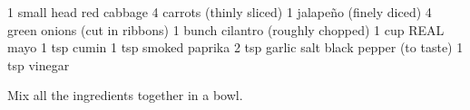\dishtype{\side}
\dishother{\vegetarian}
\begin{ingreds}
    1 small head red cabbage
    4 carrots (thinly sliced)
    1 jalapeño (finely diced)
    4 green onions (cut in ribbons)
    1 bunch cilantro (roughly chopped)
    1 cup REAL mayo
    1 tsp cumin
    1 tsp smoked paprika
    2 tsp garlic salt
    black pepper (to taste)
    1 tsp vinegar       
\end{ingreds}
\begin{method}
    Mix all the ingredients together in a bowl.
\end{method}